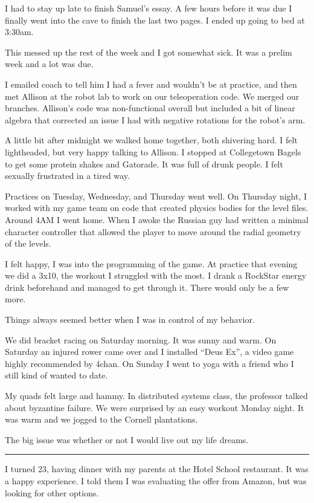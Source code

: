 I had to stay up late to finish Samuel's essay.  A few hours before it was due I
finally went into the cave to finish the last two pages.  I ended up going to
bed at 3:30am.

This messed up the rest of the week and I got somewhat sick.  It was a prelim
week and a lot was due.

I emailed coach to tell him I had a fever and wouldn't be at practice, and then
met Allison at the robot lab to work on our teleoperation code.  We merged our
branches.  Allison's code was non-functional overall but included a bit of
linear algebra that corrected an issue I had with negative rotations
for the robot's arm.

A little bit after midnight we walked home together, both shivering hard.  I
felt lightheaded, but very happy talking to Allison.  I stopped at Collegetown
Bagels to get some protein shakes and Gatorade.  It was full of drunk people.  I
felt sexually frustrated in a tired way.

Practices on Tuesday, Wednesday, and Thursday went well.  On Thursday night, I
worked with my game team on code that created physics bodies for the level
files.  Around 4AM I went home.  When I awoke the Russian guy had written a
minimal character controller that allowed the player to move around the radial
geometry of the levels.

I felt happy, I was into the programming of the game.  At practice that evening
we did a 3x10, the workout I struggled with the most.  I drank a RockStar energy
drink beforehand and managed to get through it.  There would only be a few more. 

Things always seemed better when I was in control of my behavior.

We did bracket racing on Saturday morning.  It was sunny and warm.  On Saturday
an injured rower came over and I installed ``Deus Ex'', a video game highly
recommended by 4chan.   On Sunday I went to yoga with a friend who I still kind
of wanted to date.

My quads felt large and hammy.  In distributed systems class, the professor
talked about byzantine failure.  We were surprised by an easy workout Monday
night.  It was warm and we jogged to the Cornell plantations.

The big issue was whether or not I would live out my life dreams.

\plainfancybreak{12pt}{2}{* * *}

I turned 23, having dinner with my parents at the Hotel School restaurant.  It
was a happy experience.  I told them I was evaluating the offer from Amazon, but
was looking for other options.

